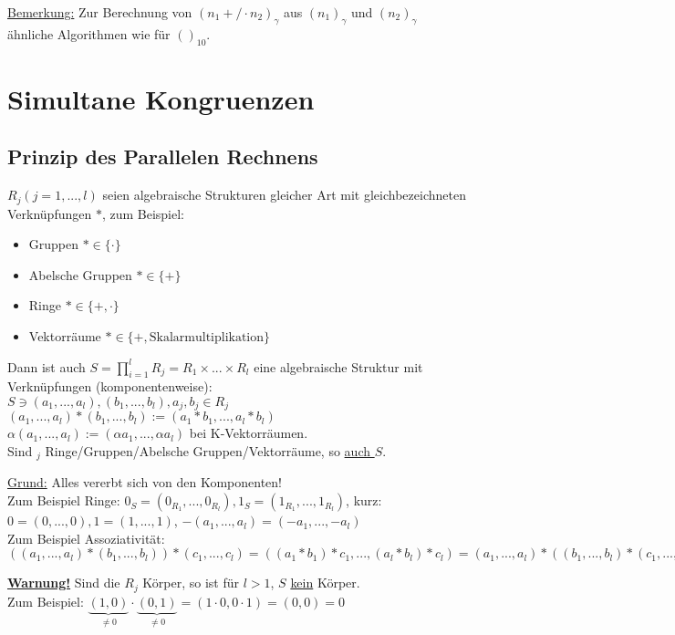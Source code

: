 \documentclass[a4paper,DIV15,BCOR12mm]{article}
\begin{document}
\underline{Bemerkung:} Zur Berechnung von $(n_1 +/\cdot n_2)_\gamma$
aus $(n_1)_\gamma$ und $(n_2)_\gamma$ ähnliche Algorithmen wie für
$()_{10}$.

\section{Simultane Kongruenzen}

\subsection{Prinzip des Parallelen Rechnens}

$R_j (j = 1,..., l)$ seien algebraische Strukturen gleicher Art mit
gleichbezeichneten Verknüpfungen $\ast$, zum Beispiel:
\begin{itemize}
    \item[] Gruppen $\ast \in \{\cdot\}$
    \item[] Abelsche Gruppen $\ast \in \{+\}$
    \item[] Ringe $\ast \in \{+, \cdot\}$
    \item[] Vektorräume $\ast \in \{+, \text{Skalarmultiplikation}\}$
\end{itemize}

Dann ist auch $S = \prod_{i=1}^lR_j = R_1 \times ... \times R_l$ eine algebraische Struktur mit Verknüpfungen (komponentenweise):\\
$S \ni (a_1,...,a_l), (b_1,...,b_l), a_j, b_j \in R_j$\\
$(a_1, ...,a_l) \ast (b_1,...,b_l) := (a_1 \ast b_1, ..., a_l \ast b_l)$\\
$\alpha(a_1, ..., a_l) := (\alpha a_1, ..., \alpha a_l)$ bei K-Vektorräumen.\\
Sind $_j$ Ringe/Gruppen/Abelsche Gruppen/Vektorräume, so
\underline{auch $S$}.

\underline{Grund:} Alles vererbt sich von den Komponenten!\\
Zum Beispiel Ringe: $0_S = (0_{R_1}, ..., 0_{R_l}), 1_S = (1_{R_1}, ..., 1_{R_l})$, kurz: $0 = (0,...,0), 1 = (1,...,1)$, $-(a_1,...,a_l) = (-a_1, ..., -a_l)$\\
Zum Beispiel Assoziativität:\\
$((a_1,...,a_l) \ast (b_1,...,b_l)) \ast (c_1,...,c_l) = ((a_1 \ast
b_1) \ast c_1, ..., (a_l \ast b_l) \ast c_l) = (a_1, ..., a_l) \ast
((b_1, ..., b_l) \ast (c_1, ..., c_l))$

\underline{\textbf{Warnung!}} Sind die $R_j$ Körper, so ist für $l > 1$, $S$ \underline{kein} Körper.\\
Zum Beispiel: $\underbrace{(1,0)}_{\not= 0} \cdot
\underbrace{(0,1)}_{\not= 0} = (1 \cdot 0, 0 \cdot 1) = (0, 0) = 0$
\end{document}
